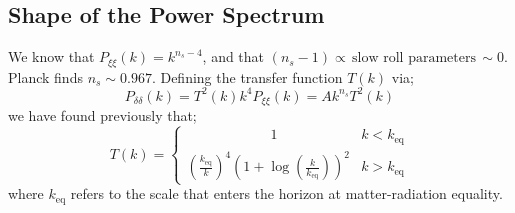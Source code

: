 \subsection{Shape of the Power Spectrum}
We know that $P_{\xi \xi}(k) = k^{n_s - 4}$, and that $(n_s - 1) \propto \, \text{slow roll parameters}\, \sim 0$. Planck finds $n_s \sim 0.967$. Defining the transfer function $T(k)$ via;
\begin{equation}
P_{\delta \delta}(k) = T^2(k)k^4 P_{\xi \xi}(k) = Ak^{n_s}T^2(k)
\end{equation}
we have found previously that;
\begin{equation}
T(k) = \begin{cases}\qquad\qquad\qquad1 & k < k_{\text{eq}}\\ \left(\frac{k_{\text{eq}}}{k}\right)^4\left(1 + \log\left(\frac{k}{k_{\text{eq}}}\right)\right)^2 & k > k_{\text{eq}}\end{cases}
\end{equation}
where $k_{\text{eq}}$ refers to the scale that enters the horizon at matter-radiation equality.
